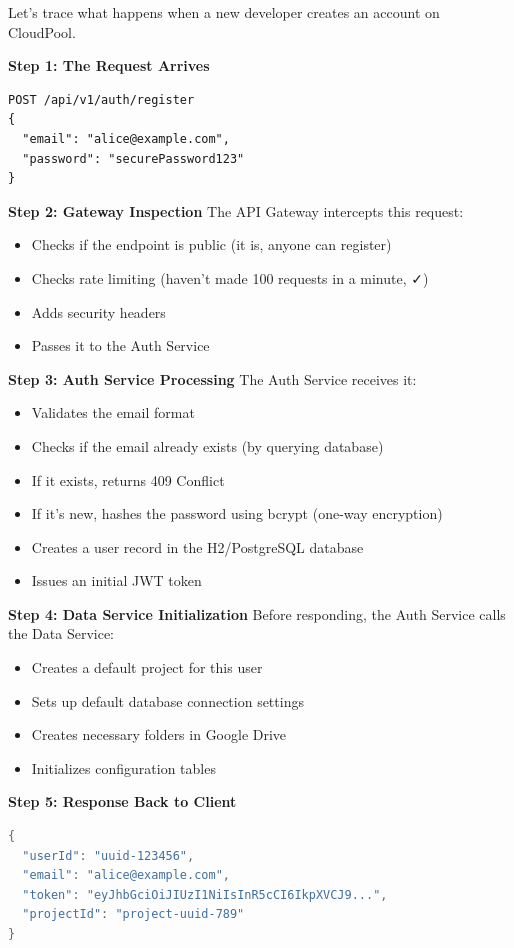 \documentclass[11pt,a4paper]{report}
\begin{document}
Let's trace what happens when a new developer creates an account on CloudPool.

\textbf{Step 1: The Request Arrives}
\begin{lstlisting}[language=text]
POST /api/v1/auth/register
{
  "email": "alice@example.com",
  "password": "securePassword123"
}
\end{lstlisting}

\textbf{Step 2: Gateway Inspection}
The API Gateway intercepts this request:
\begin{itemize}
\item Checks if the endpoint is public (it is, anyone can register)
\item Checks rate limiting (haven't made 100 requests in a minute, ✓)
\item Adds security headers
\item Passes it to the Auth Service

\end{itemize}
\textbf{Step 3: Auth Service Processing}
The Auth Service receives it:
\begin{itemize}
\item Validates the email format
\item Checks if the email already exists (by querying database)
\item If it exists, returns 409 Conflict
\item If it's new, hashes the password using bcrypt (one-way encryption)
\item Creates a user record in the H2/PostgreSQL database
\item Issues an initial JWT token

\end{itemize}
\textbf{Step 4: Data Service Initialization}
Before responding, the Auth Service calls the Data Service:
\begin{itemize}
\item Creates a default project for this user
\item Sets up default database connection settings
\item Creates necessary folders in Google Drive
\item Initializes configuration tables

\end{itemize}
\textbf{Step 5: Response Back to Client}
\begin{lstlisting}[language=Java]
{
  "userId": "uuid-123456",
  "email": "alice@example.com",
  "token": "eyJhbGciOiJIUzI1NiIsInR5cCI6IkpXVCJ9...",
  "projectId": "project-uuid-789"
}
\end{lstlisting}
\end{document}
